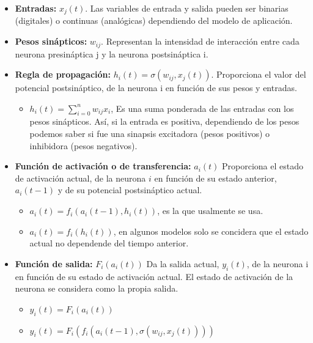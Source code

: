 \begin{itemize}
 \item \textbf{Entradas:} $x_{j}(t)$. Las variables de entrada y salida pueden ser binarias (digitales) o continuas (analógicas) dependiendo del modelo de aplicación.
 \item \textbf{Pesos sinápticos:} $w_{ij}$. Representan la intensidad de interacción entre cada neurona presináptica j y la neurona postsináptica i.
 \item \textbf{Regla de propagación:} $h_{i}(t) = \sigma(w_{ij}, x_{j}(t))$. Proporciona el valor del potencial postsináptico, de la neurona i en función de sus pesos y entradas. 
    \begin{itemize}
     \item $h_{i}(t) = \sum_{i=0}^{n} w_{ij} x_{i} $, Es una suma ponderada de las entradas con los pesos sinápticos.
      Así, si la entrada es positiva, dependiendo de los pesos podemos saber si fue una sinapsis excitadora (pesos positivos) o inhibidora (pesos negativos).
    \end{itemize}

 \item \textbf{Función de activación o de transferencia:} $a_{i}(t)$ Proporciona el estado de activación actual, de la neurona $i$ en función de su estado anterior, $a_{i}(t-1)$ y de su potencial postsináptico actual. 
    \begin{itemize}
     \item $a_{i}(t) = f_{i}(a_{i}(t-1),h_{i}(t))$, es la que usalmente se usa.
     \item $a_{i}(t) = f_{i}(h_{i}(t))$, en algunos modelos solo se concidera que el estado actual no dependende del tiempo anterior.

     \end{itemize}

 \item \textbf{Función de salida: } $F_{i}(a_{i}(t))$ Da la salida actual, $y_{i}(t)$, de la neurona i en función de su estado de activación actual. El estado de activación de la neurona se considera como la propia salida. 
    \begin{itemize}
     \item $y_{i}(t) = F_{i}(a_{i}(t))$
     \item $y_{i}(t) = F_{i}(f_{i}(a_{i}(t-1),\sigma(w_{ij},x_{j}(t))))$
    \end{itemize}

\end{itemize}


